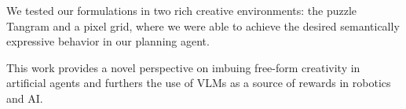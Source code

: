 We tested our formulations in two rich creative environments: the puzzle Tangram and a pixel grid, where we were able to achieve the desired semantically expressive behavior in our planning agent.

This work provides a novel perspective on imbuing free-form creativity in artificial agents and furthers the use of VLMs as a source of rewards in robotics and AI.
